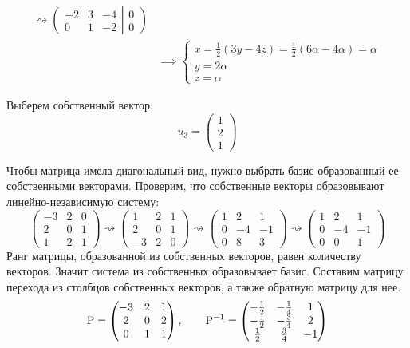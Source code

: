 \begin{align*}
  \rightsquigarrow
  \left(
  \begin{matrix}
    -2 & 3 & -4 \\
    0 & 1 & -2
  \end{matrix}
  \right|
  \left. \begin{matrix} 0 \\ 0 \end{matrix} \right) \\
  & \implies
  \begin{cases}
    x = \frac{1}{2}(3y - 4z) = \frac{1}{2}(6α- 4α) = α \\
    y = 2α \\
    z = α
  \end{cases}
\end{align*}

Выберем собственный вектор:
\[
  u_3 = \begin{pmatrix} 1 \\ 2 \\ 1 \end{pmatrix}
\]

Чтобы матрица имела диагональный вид,
нужно выбрать базис образованный ее собственными векторами.
Проверим, что собственные векторы образовывают линейно-независимую систему:
\[
  \begin{pmatrix}
    -3 & 2 & 0 \\
    2 & 0 & 1\\
    1 & 2 & 1
  \end{pmatrix} \rightsquigarrow
  \begin{pmatrix}
    1 & 2 & 1\\
    2 & 0 & 1\\
    -3 & 2 & 0
  \end{pmatrix} \rightsquigarrow
  \begin{pmatrix}
    1 & 2 & 1\\
    0 & -4 & -1\\
    0 & 8 & 3
  \end{pmatrix} \rightsquigarrow
  \begin{pmatrix}
    1 & 2 & 1\\
    0 & -4 & -1\\
    0 & 0 & 1
  \end{pmatrix}
\]
Ранг матрицы, образованной из собственных векторов, равен количеству векторов.
Значит система из собственных образовывает базис.
Составим матрицу перехода из столбцов собственных векторов,
а также обратную матрицу для нее.
\[
  \mathrm{P}
  =
  \begin{pmatrix}
    -3 & 2 & 1 \\
    2  & 0 & 2 \\
    0  & 1 & 1 \\
  \end{pmatrix} ,\qquad
  {\mathrm{P}}^{-1}
  =
  \begin{pmatrix}
    -\frac{1}{2} & -\frac{1}{4} & 1 \\
    -\frac{1}{2} & -\frac{3}{4} & 2 \\
    \frac{1}{2} & \frac{3}{4} & -1
  \end{pmatrix}
\]

